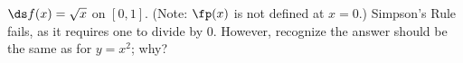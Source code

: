 {$\ds f(x) = \sqrt{x}$ on $[0, 1]$. (Note: $\fp(x)$ is not defined at $x=0$.)}
{Simpson's Rule fails, as it requires one to divide by 0. However, recognize the answer should be the same as for $y=x^2$; why?}
